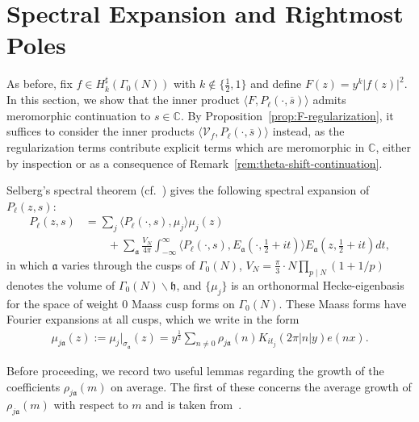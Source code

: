 \documentclass[11pt,reqno]{amsart}
\theoremstyle{plain}
\theoremstyle{definition}
\numberwithin{equation}{section}
\begin{document}

\section{Spectral Expansion and Rightmost Poles} \label{sec:spectral-expansion}

As before, fix $f \in H_k^\sharp(\Gamma_0(N))$ with $k \notin \{\frac{1}{2}, 1\}$ and define $F(z) = y^k \vert f(z) \vert^2$. In this section, we show that the inner product $\langle F, P_\ell(\cdot, \overline{s}) \rangle$ admits meromorphic continuation to $s \in \mathbb{C}$. By Proposition~\ref{prop:F-regularization}, it suffices to consider the inner products $\langle \mathcal{V}_f, P_\ell(\cdot , \overline{s}) \rangle$ instead, as the regularization terms contribute explicit terms which are meromorphic in $\mathbb{C}$, either by inspection or as a consequence of Remark~\ref{rem:theta-shift-continuation}.

Selberg's spectral theorem (cf.~\cite[Theorem 15.5]{IwaniecKowalski04}) gives the following spectral expansion of $P_\ell(z,s)$:
\begin{align} \label{eq:spectral-expansion-template}
	P_\ell(z,s) &= \sum_j \langle P_\ell(\cdot ,s ), \mu_j \rangle \mu_j(z) \\
	& \qquad + \sum_{\mathfrak{a}} \frac{V_N}{4\pi}
		\int_{-\infty}^\infty \langle P_\ell(\cdot, s) ,E_\mathfrak{a}(\cdot, \tfrac{1}{2}+it) \rangle 
			E_\mathfrak{a}(z, \tfrac{1}{2}+it) dt,
\end{align}
in which $\mathfrak{a}$ varies through the cusps of $\Gamma_0(N)$, $V_N = \frac{\pi}{3} \cdot N \prod_{p \mid N}(1+1/p)$ denotes the volume of $\Gamma_0(N) \backslash \mathfrak{h}$, and $\{\mu_j\}$ is an orthonormal Hecke-eigenbasis for the space of weight $0$ Maass cusp forms on $\Gamma_0(N)$. These Maass forms have Fourier expansions at all cusps, which we write in the form
\begin{align} \label{eq:Maass-form-Fourier-expansion}
	\mu_{j\mathfrak{a}}(z) 
	:= \mu_j \vert_{\sigma_{\mathfrak{a}}}(z)
	= y^{\frac{1}{2}} \sum_{ n \neq 0} \rho_{j\mathfrak{a}}(n) K_{it_j}(2\pi \vert n \vert y) e(nx).
\end{align}

Before proceeding, we record two useful lemmas regarding the growth of the coefficients $\rho_{j\mathfrak{a}}(m)$ on average. The first of these concerns the average growth of $\rho_{j\mathfrak{a}}(m)$ with respect to $m$ and is taken from~\cite{Iwaniec02}.
\end{document}
